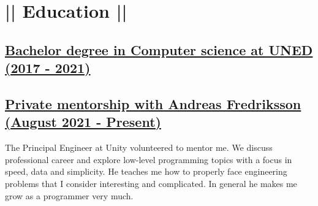\section*{|| Education ||}
\subsection*{\underline{Bachelor degree in Computer science at UNED (2017 - 2021)}}
\subsection*{\underline{Private mentorship with Andreas Fredriksson (August 2021 - Present)}}
The Principal Engineer at Unity volunteered to mentor me. We discuss professional career and explore low-level programming topics with a focus in speed, data and simplicity. He teaches me how to properly face engineering problems that I consider interesting and complicated. In general he makes me grow as a programmer very much.